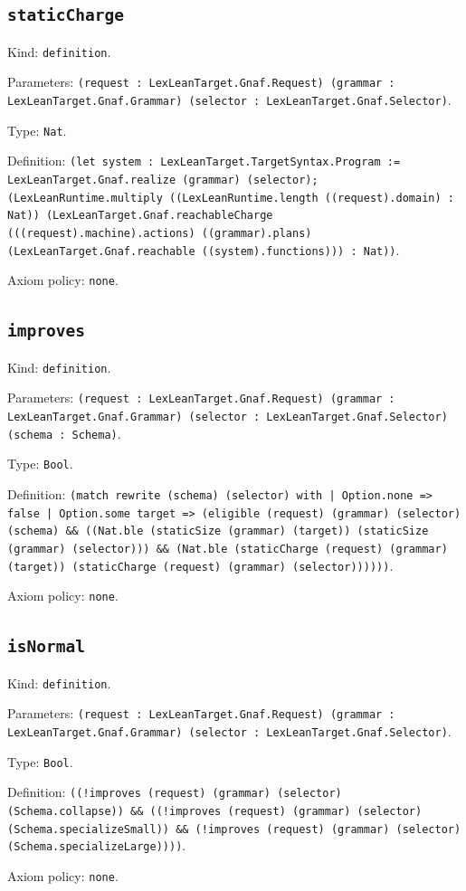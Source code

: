\documentclass[11pt]{article}
\begin{document}
\subsection*{\texttt{staticCharge}}
\noindent Kind: \texttt{definition}.\par
\noindent Parameters: \texttt{(request : LexLeanTarget.Gnaf.Request) (grammar : LexLeanTarget.Gnaf.Grammar) (selector : LexLeanTarget.Gnaf.Selector)}.\par
\noindent Type: \texttt{Nat}.\par
\noindent Definition: \texttt{(let system : LexLeanTarget.TargetSyntax.Program := LexLeanTarget.Gnaf.realize (grammar) (selector); (LexLeanRuntime.multiply ((LexLeanRuntime.length ((request).domain) : Nat)) (LexLeanTarget.Gnaf.reachableCharge (((request).machine).actions) ((grammar).plans) (LexLeanTarget.Gnaf.reachable ((system).functions))) : Nat))}.\par
\noindent Axiom policy: \texttt{none}.\par
\subsection*{\texttt{improves}}
\noindent Kind: \texttt{definition}.\par
\noindent Parameters: \texttt{(request : LexLeanTarget.Gnaf.Request) (grammar : LexLeanTarget.Gnaf.Grammar) (selector : LexLeanTarget.Gnaf.Selector) (schema : Schema)}.\par
\noindent Type: \texttt{Bool}.\par
\noindent Definition: \texttt{(match rewrite (schema) (selector) with | Option.none => false | Option.some target => (eligible (request) (grammar) (selector) (schema) \&\& ((Nat.ble (staticSize (grammar) (target)) (staticSize (grammar) (selector))) \&\& (Nat.ble (staticCharge (request) (grammar) (target)) (staticCharge (request) (grammar) (selector))))))}.\par
\noindent Axiom policy: \texttt{none}.\par
\subsection*{\texttt{isNormal}}
\noindent Kind: \texttt{definition}.\par
\noindent Parameters: \texttt{(request : LexLeanTarget.Gnaf.Request) (grammar : LexLeanTarget.Gnaf.Grammar) (selector : LexLeanTarget.Gnaf.Selector)}.\par
\noindent Type: \texttt{Bool}.\par
\noindent Definition: \texttt{((!improves (request) (grammar) (selector) (Schema.collapse)) \&\& ((!improves (request) (grammar) (selector) (Schema.specializeSmall)) \&\& (!improves (request) (grammar) (selector) (Schema.specializeLarge))))}.\par
\noindent Axiom policy: \texttt{none}.\par
\end{document}

